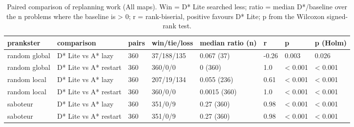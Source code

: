 \begin{table}[t]
\centering
\small
\caption{Paired comparison of replanning work (All maps). Win = D* Lite searched less; ratio = median D*/baseline over the n problems where the baseline is > 0; r = rank-biserial, positive favours D* Lite; p from the Wilcoxon signed-rank test.}
\label{tab:tests-replan-all}
\begin{tabular}{llllllll}
\toprule
prankster & comparison & pairs & win/tie/loss & median ratio (n) & r & p & p (Holm) \\
\midrule
random global & D* Lite vs A* lazy & 360 & 37/188/135 & 0.067 (37) & -0.26 & 0.003 & 0.026 \\
random global & D* Lite vs A* restart & 360 & 360/0/0 & 0 (360) & 1.0 & < 0.001 & < 0.001 \\
random local & D* Lite vs A* lazy & 360 & 207/19/134 & 0.055 (236) & 0.61 & < 0.001 & < 0.001 \\
random local & D* Lite vs A* restart & 360 & 360/0/0 & 0.0015 (360) & 1.0 & < 0.001 & < 0.001 \\
saboteur & D* Lite vs A* lazy & 360 & 351/0/9 & 0.27 (360) & 0.98 & < 0.001 & < 0.001 \\
saboteur & D* Lite vs A* restart & 360 & 351/0/9 & 0.27 (360) & 0.98 & < 0.001 & < 0.001 \\
\bottomrule
\end{tabular}
\end{table}
